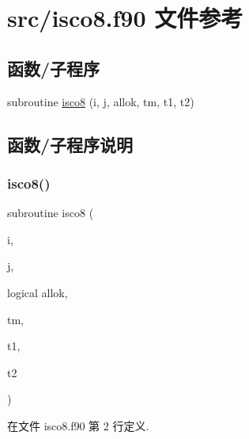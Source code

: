 \hypertarget{isco8_8f90}{}\section{src/isco8.f90 文件参考}
\label{isco8_8f90}
\subsection*{函数/子程序}
\begin{DoxyCompactItemize}
\item 
subroutine \mbox{\hyperlink{isco8_8f90_a9450ed474edefee41ccc0db34a32174e}{isco8}} (i, j, allok, tm, t1, t2)
\end{DoxyCompactItemize}


\subsection{函数/子程序说明}
\mbox{\label{isco8_8f90_a9450ed474edefee41ccc0db34a32174e}} 
\subsubsection{\texorpdfstring{isco8()}{isco8()}}
{\footnotesize\ttfamily subroutine isco8 (\begin{DoxyParamCaption}\item[{}]{i,  }\item[{}]{j,  }\item[{logical}]{allok,  }\item[{}]{tm,  }\item[{}]{t1,  }\item[{}]{t2 }\end{DoxyParamCaption})}



在文件 isco8.\+f90 第 2 行定义.

